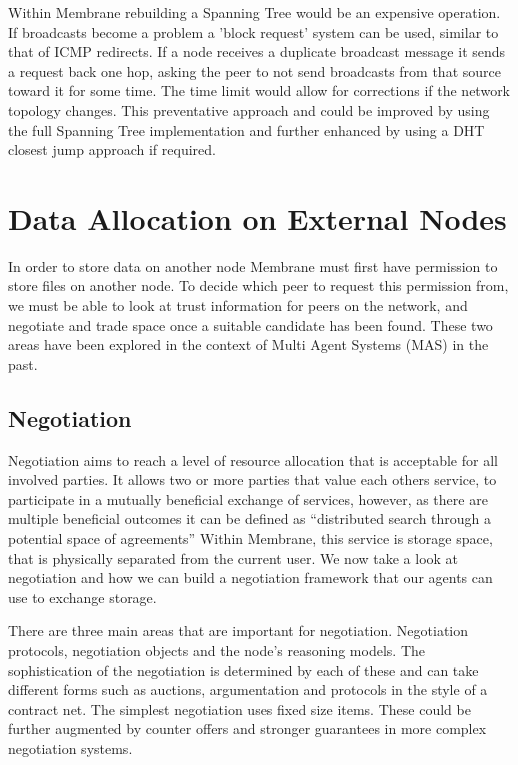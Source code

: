 \documentclass[11pt, a4paper, twoside]{report}
\begin{document}
Within Membrane rebuilding a Spanning Tree would be an expensive operation. If broadcasts become a problem a 'block request' system can be used, similar to that of ICMP redirects. \citep{postel1981rfc} If a node receives a duplicate broadcast message it sends a request back one hop, asking the peer to not send broadcasts from that source toward it for  some time. The time limit would allow for corrections if the network topology changes. This preventative approach and could be improved by using the full Spanning Tree implementation and further enhanced by using a DHT closest jump approach if required.

\section{Data Allocation on External Nodes}

In order to store data on another node Membrane must first have permission to store files on another node. To decide which peer to request this permission from, we must be able to look at trust information for peers on the network, and negotiate and trade space once a suitable candidate has been found. These two areas have been explored in the context of Multi Agent Systems (MAS) in the past. \citep{wooldridge2009introduction}

\subsection{Negotiation} \label{sec:neg}

Negotiation aims to reach a level of resource allocation that is acceptable for all involved parties. \citep{rahwan2005interest} It allows two or more parties that value each others service, to participate in a mutually beneficial exchange of services, however, as there are multiple beneficial outcomes it can be defined as ``distributed search through a potential space of agreements'' \citep{jennings2001automated} Within Membrane, this service is storage space, that is physically separated from the current user. We now take a look at negotiation and how we can build a negotiation framework that our agents can use to exchange storage.

There are three main areas that are important for negotiation. Negotiation protocols, negotiation objects and the node's reasoning models. \citep{beer1999negotiation} The sophistication of the negotiation is determined by each of these and can take different forms such as auctions, argumentation and protocols in the style of a contract net. The simplest negotiation uses fixed size items. These could be further augmented by counter offers and stronger guarantees in more complex negotiation systems.
\end{document}
